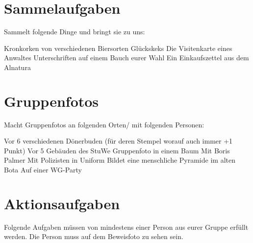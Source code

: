 \documentclass[11pt,paper=a4,answers]{exam}
\renewenvironment{questions}{
	\begin{q}
		\pointsinrightmargin
		\marginpointname{\ Pkt}
		\bracketedpoints }{
	\end{q}}
\begin{document}
\section*{Sammelaufgaben}
	Sammelt folgende Dinge und bringt sie zu uns:
	\begin{questions}
		 Kronkorken von verschiedenen Biersorten
		 Glückskeks
		\question[15] Die Visitenkarte eines Anwaltes
		 Unterschriften auf einem Bauch eurer Wahl
		\question[5] Ein Einkaufszettel aus dem Alnatura
		
	\end{questions}

\section*{Gruppenfotos}
	Macht Gruppenfotos an folgenden Orten/ mit folgenden Personen:
	\begin{questions}
		\question[6+6] Vor 6 verschiedenen Dönerbuden (für deren Stempel worauf auch immer +1 Punkt)
		\question[5] Vor 5 Gebäuden des StuWe 
		\question[10] Gruppenfoto in einem Baum
		\question[100] Mit Boris Palmer
		\question[10] Mit Polizisten in Uniform
		\marginpointname{} 
		 Bildet eine menschliche Pyramide im alten Bota
		 Auf einer WG-Party
	
	\end{questions}

\section*{Aktionsaufgaben}
	Folgende Aufgaben müssen von mindestens einer Person aus eurer Gruppe erfüllt werden. Die Person muss auf dem Beweisfoto zu sehen sein.
	
\end{document}
